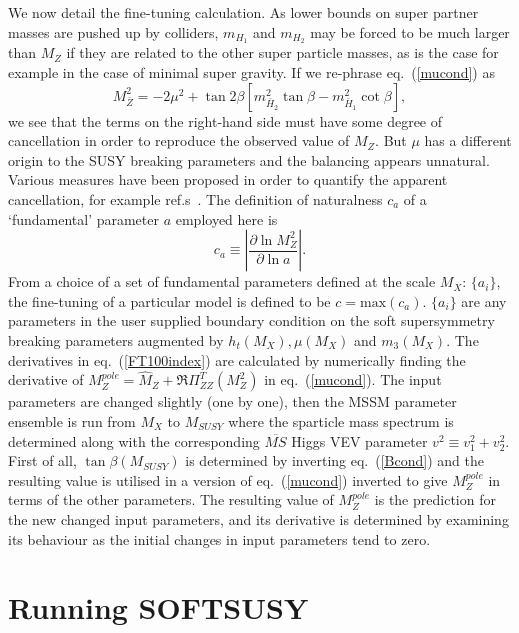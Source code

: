 \documentclass[]{article}
\begin{document}
We now detail the fine-tuning calculation. 
As lower bounds on super partner masses are pushed up by colliders,
$m_{H_1}$ and $m_{H_2}$ may be forced to be much larger than $M_Z$ if they are
related to the other super particle masses, as is the case
for example in the case of 
minimal super gravity. 
If we re-phrase eq.~(\ref{mucond}) as
\begin{equation}
M_{\bar Z}^2  = -2
\mu^2 + \tan 2\beta \left[m_{\bar{H}_2}^2\tan \beta
- m_{\bar{H}_1}^2  \cot \beta \right],
\end{equation}
we see that the terms on the right-hand side must have 
some degree of cancellation in order to reproduce the 
observed value of $M_Z$.
But $\mu$ has a different origin to the SUSY breaking parameters and the
balancing appears unnatural. Various measures have
been proposed in order to quantify the apparent cancellation, for
example ref.s~\cite{Barbieri:1998uv,deCarlos:1993yy}.
The definition of naturalness $c_a$ 
of a `fundamental' parameter $a$ employed here is~\cite{deCarlos:1993yy} 
\begin{equation}
c_a \equiv \left| \frac{\partial \ln M_Z^2}{\partial \ln a} \right|.
\label{FT100index}
\end{equation}
From a choice of a set of fundamental parameters defined at the scale $M_X$:
$\{ a_i \}$, the 
fine-tuning of a particular model is defined to be $c=\mbox{max}(c_a)$.
$\{ a_i \}$ are any parameters in the user supplied boundary condition on the
soft supersymmetry breaking parameters augmented by $h_t(M_X), \mu(M_X)$ and
$m_3(M_X)$. The derivatives in eq.~(\ref{FT100index}) are calculated by 
numerically finding the derivative of $M_Z^{pole}=\hat M_Z +
\Re\Pi_{ZZ}^T(M_Z^2)$ in eq.~(\ref{mucond}). 
The input parameters are
changed slightly (one by one), then the MSSM parameter ensemble is run from 
$M_X$ to $M_{SUSY}$ where the sparticle mass spectrum is determined along with the
corresponding $\overline{MS}$ Higgs VEV parameter
$v^2 \equiv v_1^2 + v_2^2$. 
First of all, $\tan \beta(M_{SUSY})$ is determined by inverting
eq.~(\ref{Bcond}) and the resulting value is utilised in a version of
eq.~(\ref{mucond}) inverted to give $M_Z^{pole}$ in terms of the other
parameters.
The resulting value of $M_Z^{pole}$ is the
prediction for the new changed input parameters, and its derivative is
determined by examining its behaviour as the initial changes in input
parameters tend to zero.

\appendix

\section{Running SOFTSUSY}
\label{sec:run}
\end{document}
